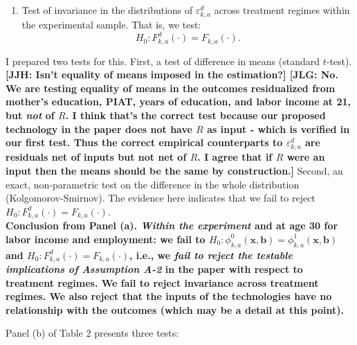 \begin{enumerate}
\item Test of invariance in the distributions of $\varepsilon_{k,a}^d$ across treatment regimes within the experimental sample. That is, we test:
	\begin{equation} 
	H_0: F_{k,a}^d \left( \cdot \right) = F_{k,a} \left( \cdot \right).
	\end{equation}
\end{enumerate}

\noindent I prepared two tests for this. First, a test of difference in means (standard $t$-test). \textbf{[JJH: Isn't equality of means imposed in the estimation?] [JLG: No. We are testing equality of means in the outcomes residualized from mother's education, PIAT, years of education, and labor income at 21, but \textit{not} of $R$. I think that's the correct test because our proposed technology in the paper does not have $R$ as input - which is verified in our first test. Thus the correct empirical counterparts to $\varepsilon_{k,a}^d$ are residuals net of inputs but not net of $R$. I agree that if $R$ were an input then the means should be the same by construction.]} Second, an exact, non-parametric test on the difference in the whole distribution (Kolgomorov-Smirnov). The evidence here indicates that we fail to reject $H_0: F_{k,a}^d \left( \cdot \right) = F_{k,a} \left( \cdot \right)$.\\ 

\noindent \textbf{Conclusion from Panel (a). \textit{Within the experiment} and at age 30 for labor income and employment: we fail to $H_0: \phi_{k,a}^0 \left( \bm{x}, \bm{b} \right) = \phi_{k,a}^1 \left( \bm{x}, \bm{b} \right)$ and $H_0: F_{k,a}^d \left( \cdot \right) = F_{k,a} \left( \cdot \right)$, i.e., we \textit{fail to reject the testable implications of Assumption A-2} in the paper with respect to treatment regimes. We fail to reject invariance across treatment regimes. We also reject that the inputs of the technologies have no relationship with the outcomes (which may be a detail at this point).}

\noindent Panel (b) of Table 2 presents three tests: 

